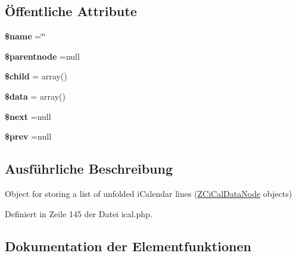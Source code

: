\subsection*{Öffentliche Attribute}
\begin{DoxyCompactItemize}
\item 
\mbox{\label{class_z_ci_cal_node_a7b6febcff6d479a8268ea8fe59c4dd5e}} 
{\bfseries \$name} =\char`\"{}\char`\"{}
\item 
\mbox{\label{class_z_ci_cal_node_a490bf611e4f638174e2a97892cbdab77}} 
{\bfseries \$parentnode} =null
\item 
\mbox{\label{class_z_ci_cal_node_a685045c220357b08a539b02fa13b6a95}} 
{\bfseries \$child} = array()
\item 
\mbox{\label{class_z_ci_cal_node_aa8d3e48ce94c0331dc9aa24fea17921a}} 
{\bfseries \$data} = array()
\item 
\mbox{\label{class_z_ci_cal_node_a6ec4f6da23f46e1ed18adf3bd6e2db0a}} 
{\bfseries \$next} =null
\item 
\mbox{\label{class_z_ci_cal_node_ae00270c9689157772f2738c9a942648e}} 
{\bfseries \$prev} =null
\end{DoxyCompactItemize}


\subsection{Ausführliche Beschreibung}
Object for storing a list of unfolded i\+Calendar lines (\mbox{\hyperlink{class_z_ci_cal_data_node}{Z\+Ci\+Cal\+Data\+Node}} objects) 

Definiert in Zeile 145 der Datei ical.\+php.



\subsection{Dokumentation der Elementfunktionen}
\mbox{\label{class_z_ci_cal_node_ab6f20676b8478e7dc0a70ce47995a28c}} 
